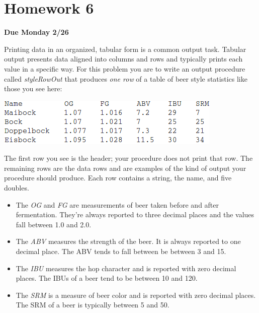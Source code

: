 \documentclass[nobib]{tufte-handout}
\begin{document}
\newpage

\section{Homework 6}

\begin{center}
\textbf{Due Monday 2/26}
\end{center}

Printing data in an organized, tabular form is a common output task.  Tabular output presents data aligned into columns and rows and typically prints each value in a specific way.  For this problem you are to write an output procedure called \textit{styleRowOut} that produces \textit{one row} of a table of beer style statistics like those you see here:

\vspace{.1in}
\begin{center}
\includegraphics[scale=.5]{tabExample.png}
\end{center}
\vspace{.1in}

The first row you see is the header; your procedure does not print that row. The remaining rows are the data rows and are examples of the kind of output your procedure should produce. Each row contains a string, the name, and five doubles.
\begin{itemize}
\item  The \textit{OG} and \textit{FG} are measurements of beer taken before and after fermentation. They're always reported to three decimal places and the values fall between 1.0 and 2.0.
\item The \textit{ABV} measures the strength of the beer. It is always reported to one decimal place. The ABV tends to fall between be between 3 and 15.
\item The \textit{IBU} measures the hop character and is reported with zero decimal places. The IBUs of a beer tend to be between 10 and 120.
\item The \textit{SRM} is a measure of beer color and is reported with zero decimal places. The SRM of a beer is typically between 5 and 50.
\end{itemize}
\end{document}
